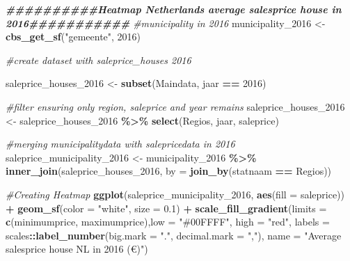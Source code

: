 \documentclass[
]{article}
\newenvironment{Shaded}{\begin{snugshade}}{\end{snugshade}}
\newcommand{\AttributeTok}[1]{\textcolor[rgb]{0.13,0.29,0.53}{#1}}
\newcommand{\CommentTok}[1]{\textcolor[rgb]{0.56,0.35,0.01}{\textit{#1}}}
\newcommand{\DecValTok}[1]{\textcolor[rgb]{0.00,0.00,0.81}{#1}}
\newcommand{\DocumentationTok}[1]{\textcolor[rgb]{0.56,0.35,0.01}{\textbf{\textit{#1}}}}
\newcommand{\FloatTok}[1]{\textcolor[rgb]{0.00,0.00,0.81}{#1}}
\newcommand{\FunctionTok}[1]{\textcolor[rgb]{0.13,0.29,0.53}{\textbf{#1}}}
\newcommand{\NormalTok}[1]{#1}
\newcommand{\OtherTok}[1]{\textcolor[rgb]{0.56,0.35,0.01}{#1}}
\newcommand{\SpecialCharTok}[1]{\textcolor[rgb]{0.81,0.36,0.00}{\textbf{#1}}}
\newcommand{\StringTok}[1]{\textcolor[rgb]{0.31,0.60,0.02}{#1}}
\begin{document}
\begin{Shaded}
\begin{Highlighting}[]
\DocumentationTok{\#\#\#\#\#\#\#\#\#\#Heatmap Netherlands average salesprice house in 2016\#\#\#\#\#\#\#\#\#\#\#}
\CommentTok{\#municipality in 2016}
\NormalTok{municipality\_2016 }\OtherTok{\textless{}{-}} \FunctionTok{cbs\_get\_sf}\NormalTok{(}\StringTok{"gemeente"}\NormalTok{, }\DecValTok{2016}\NormalTok{)}

\CommentTok{\#create dataset with saleprice\_houses 2016}

\NormalTok{saleprice\_houses\_2016 }\OtherTok{\textless{}{-}} \FunctionTok{subset}\NormalTok{(Maindata, jaar }\SpecialCharTok{==} \DecValTok{2016}\NormalTok{) }

\CommentTok{\#filter ensuring only region, saleprice and year remains}
\NormalTok{saleprice\_houses\_2016 }\OtherTok{\textless{}{-}}\NormalTok{ saleprice\_houses\_2016 }\SpecialCharTok{\%\textgreater{}\%}
  \FunctionTok{select}\NormalTok{(}\StringTok{\textasciigrave{}}\AttributeTok{Regio\textquotesingle{}s}\StringTok{\textasciigrave{}}\NormalTok{, jaar, saleprice)}

\CommentTok{\#merging municipalitydata with salepricedata in 2016}
\NormalTok{saleprice\_municipality\_2016 }\OtherTok{\textless{}{-}}\NormalTok{ municipality\_2016 }\SpecialCharTok{\%\textgreater{}\%} \FunctionTok{inner\_join}\NormalTok{(saleprice\_houses\_2016, }\AttributeTok{by =} \FunctionTok{join\_by}\NormalTok{(statnaam }\SpecialCharTok{==} \StringTok{\textasciigrave{}}\AttributeTok{Regio\textquotesingle{}s}\StringTok{\textasciigrave{}}\NormalTok{))}

\CommentTok{\#Creating Heatmap }
\FunctionTok{ggplot}\NormalTok{(saleprice\_municipality\_2016, }\FunctionTok{aes}\NormalTok{(}\AttributeTok{fill =}\NormalTok{ saleprice)) }\SpecialCharTok{+}
  \FunctionTok{geom\_sf}\NormalTok{(}\AttributeTok{color =} \StringTok{"white"}\NormalTok{, }\AttributeTok{size =} \FloatTok{0.1}\NormalTok{) }\SpecialCharTok{+}
  \FunctionTok{scale\_fill\_gradient}\NormalTok{(}\AttributeTok{limits =} \FunctionTok{c}\NormalTok{(minimumprice, maximumprice),}\AttributeTok{low =} \StringTok{"\#00FFFF"}\NormalTok{, }\AttributeTok{high =} \StringTok{"red"}\NormalTok{, }\AttributeTok{labels =}\NormalTok{ scales}\SpecialCharTok{::}\FunctionTok{label\_number}\NormalTok{(}\AttributeTok{big.mark =} \StringTok{"."}\NormalTok{, }\AttributeTok{decimal.mark =} \StringTok{","}\NormalTok{), }\AttributeTok{name =} \StringTok{"Average salesprice house NL in 2016 (€)"}\NormalTok{) }
\end{Highlighting}
\end{Shaded}
\end{document}
